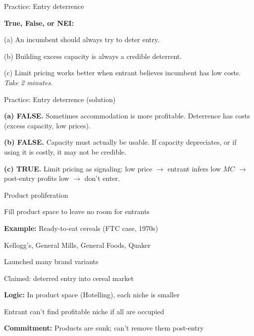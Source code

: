 \documentclass[notes,11pt, aspectratio=169]{beamer}
\newenvironment{wideitemize}{\itemize\addtolength{\itemsep}{10pt}}{\enditemize}
\begin{document}
\begin{frame}{Practice: Entry deterrence}
	\begin{wideitemize}
		\item \textbf{True, False, or NEI:}
		\item (a) An incumbent should always try to deter entry.
		\item (b) Building excess capacity is always a credible deterrent.
		\item (c) Limit pricing works better when entrant believes incumbent has low costs.
	\end{wideitemize}
	\vspace{10pt}
	\centering
	\textit{Take 2 minutes.}
\end{frame}

\begin{frame}{Practice: Entry deterrence (solution)}
	\begin{wideitemize}
		\item \textbf{(a) FALSE.} Sometimes accommodation is more profitable. Deterrence has costs (excess capacity, low prices).
		\item \textbf{(b) FALSE.} Capacity must actually be usable. If capacity depreciates, or if using it is costly, it may not be credible.
		\item \textbf{(c) TRUE.} Limit pricing as signaling: low price $\rightarrow$ entrant infers low $MC$ $\rightarrow$ post-entry profits low $\rightarrow$ don't enter.
	\end{wideitemize}
\end{frame}

\begin{frame}{Product proliferation}
	\begin{wideitemize}
		\item Fill product space to leave no room for entrants
		\item \textbf{Example:} Ready-to-eat cereals (FTC case, 1970s)
		\begin{wideitemize}
			\vspace{5pt}
			\item Kellogg's, General Mills, General Foods, Quaker
			\item Launched many brand variants
			\item Claimed: deterred entry into cereal market
		\end{wideitemize}
		\item \textbf{Logic:} In product space (Hotelling), each niche is smaller
		\item Entrant can't find profitable niche if all are occupied
		\item \textbf{Commitment:} Products are sunk; can't remove them post-entry
	\end{wideitemize}
\end{frame}
\end{document}
